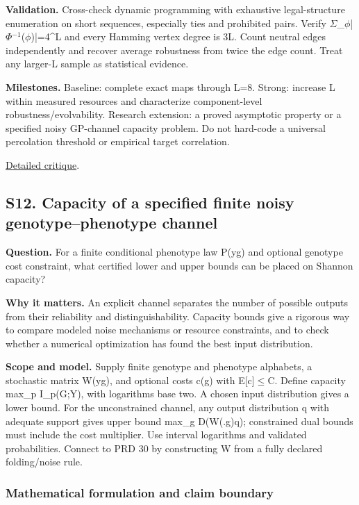 \documentclass[
  11pt,
]{article}
\begin{document}
\textbf{Validation.} Cross-check dynamic programming with exhaustive
legal-structure enumeration on short sequences, especially ties and
prohibited pairs. Verify
\ensuremath{\Sigma}\_\ensuremath{\phi}|\ensuremath{\Phi}\ensuremath{{}^{-1}}(\ensuremath{\phi})|=4\textasciicircum{}L
and every Hamming vertex degree is 3L. Count neutral edges independently
and recover average robustness from twice the edge count. Treat any
larger-L sample as statistical evidence.

\textbf{Milestones.} Baseline: complete exact maps through L=8. Strong:
increase L within measured resources and characterize component-level
robustness/evolvability. Research extension: a proved asymptotic
property or a specified noisy GP-channel capacity problem. Do not
hard-code a universal percolation threshold or empirical target
correlation.

\href{https://github.com/rick-stevens-ai/Pure-Thought/blob/main/reviews/30-Genotype-Phenotype-Mapping.md}{Detailed
critique}.

\subsection{S12. Capacity of a specified finite noisy
genotype--phenotype channel}

\textbf{Question.} For a finite conditional phenotype law P(y\textbar g)
and optional genotype cost constraint, what certified lower and upper
bounds can be placed on Shannon capacity?

\textbf{Why it matters.} An explicit channel separates the number of
possible outputs from their reliability and distinguishability. Capacity
bounds give a rigorous way to compare modeled noise mechanisms or
resource constraints, and to check whether a numerical optimization has
found the best input distribution.

\textbf{Scope and model.} Supply finite genotype and phenotype
alphabets, a stochastic matrix W(y\textbar g), and optional costs c(g)
with E[c]\ensuremath{\le}C. Define capacity max\_p I\_p(G;Y), with
logarithms base two. A chosen input distribution gives a lower bound.
For the unconstrained channel, any output distribution q with adequate
support gives upper bound max\_g D(W(.\textbar g)\textbar\textbar q);
constrained dual bounds must include the cost multiplier. Use interval
logarithms and validated probabilities. Connect to PRD 30 by
constructing W from a fully declared folding/noise rule.

\subsubsection{Mathematical formulation and claim boundary}
\end{document}
